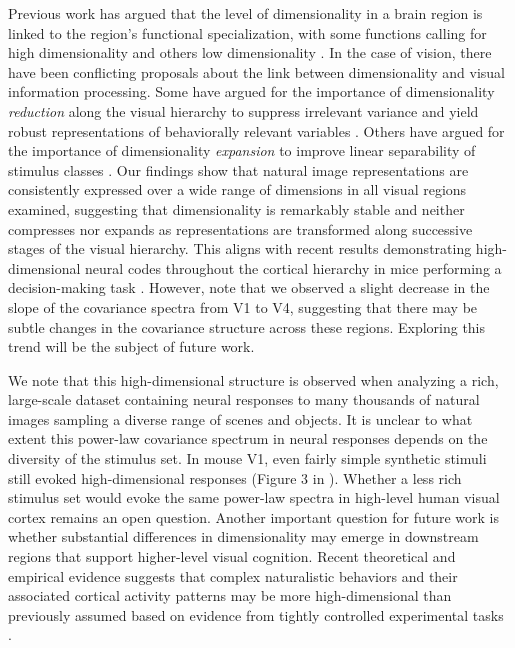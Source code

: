 \documentclass[10pt]{article}
\begin{document}
Previous work has argued that the level of dimensionality in a brain region is linked to the region's functional specialization, with some functions calling for high dimensionality and others low dimensionality \autocites[e.g.][]{Fusi2016,CaycoGajic2019}. In the case of vision, there have been conflicting proposals about the link between dimensionality and visual information processing. Some have argued for the importance of dimensionality \emph{reduction} along the visual hierarchy to suppress irrelevant variance and yield robust representations of behaviorally relevant variables \autocite{Ansuini2019,Cohen2020,Lehky2016,Fusi2016}. Others have argued for the importance of dimensionality \emph{expansion} to improve linear separability of stimulus classes \autocite{Babadi2014,Elmoznino2024}. Our findings show that natural image representations are consistently expressed over a wide range of dimensions in all visual regions examined, suggesting that dimensionality is remarkably stable and neither compresses nor expands as representations are transformed along successive stages of the visual hierarchy. This aligns with recent results demonstrating high-dimensional neural codes throughout the cortical hierarchy in mice performing a decision-making task \autocite{Posani2024}. However, note that we observed a slight decrease in the slope of the covariance spectra from V1 to V4, suggesting that there may be subtle changes in the covariance structure across these regions. Exploring this trend will be the subject of future work.

We note that this high-dimensional structure is observed when analyzing a rich, large-scale dataset containing neural responses to many thousands of natural images sampling a diverse range of scenes and objects. It is unclear to what extent this power-law covariance spectrum in neural responses depends on the diversity of the stimulus set. In mouse V1, even fairly simple synthetic stimuli still evoked high-dimensional responses (Figure 3 in \textcite{Stringer2019}). Whether a less rich stimulus set would evoke the same power-law spectra in high-level human visual cortex remains an open question. Another important question for future work is whether substantial differences in dimensionality may emerge in downstream regions that support higher-level visual cognition. Recent theoretical and empirical evidence suggests that complex naturalistic behaviors and their associated cortical activity patterns may be more high-dimensional than previously assumed based on evidence from tightly controlled experimental tasks \autocite{Rigotti2013,Yan2020,Bialek2022,Posani2024}.
\end{document}
